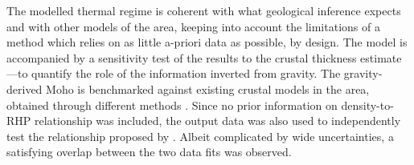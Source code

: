 The modelled thermal regime is coherent with what geological inference expects and with other models of the area, keeping into account the limitations of a method which relies on as little a-priori data as possible, by design.
The model is accompanied by a sensitivity test of the results to the crustal thickness estimate ---to quantify the role of the information inverted from gravity.
The gravity-derived Moho is benchmarked against existing crustal models in the area, obtained through different methods \parencites{Grad2009}{Pasyanos2014}{Reguzzoni2015}.
Since no prior information on density-to-RHP relationship was included, the output data was also used to independently test the relationship proposed by \textcite{Hasterok2017_ign}.
Albeit complicated by wide uncertainties, a satisfying overlap between the two data fits was observed.
\\

\nocite{Pastorutti2019}






